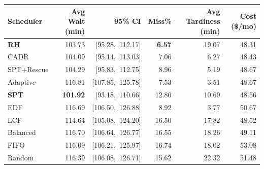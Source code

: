 \begin{tabular}{lrrrrr}
\toprule
\textbf{Scheduler} & \textbf{Avg Wait (min)} & \textbf{95\% CI} & \textbf{Miss\%} & \textbf{Avg Tardiness (min)} & \textbf{Cost (\$/mo)} \\
\midrule
\textbf{RH} & 103.73 & [95.28,~112.17] & \textbf{6.57} & 19.07 & 48.31 \\
CADR & 104.09 & [95.14,~113.03] & 7.06 & 6.27 & 48.43 \\
SPT+Rescue & 104.29 & [95.83,~112.75] & 8.96 & 5.19 & 48.67 \\
Adaptive & 116.81 & [107.85,~125.78] & 7.53 & 3.51 & 48.67 \\
\textbf{SPT} & \textbf{101.92} & [93.18,~110.66] & 12.86 & 10.69 & 48.56 \\
EDF & 116.69 & [106.50,~126.88] & 8.92 & 3.77 & 50.67 \\
LCF & 114.64 & [105.08,~124.20] & 16.50 & 17.82 & 48.52 \\
Balanced & 116.70 & [106.64,~126.77] & 16.55 & 18.26 & 49.11 \\
FIFO & 116.09 & [106.21,~125.97] & 16.74 & 18.02 & 53.08 \\
Random & 116.39 & [106.08,~126.71] & 15.62 & 22.32 & 51.48 \\
\bottomrule
\end{tabular}
